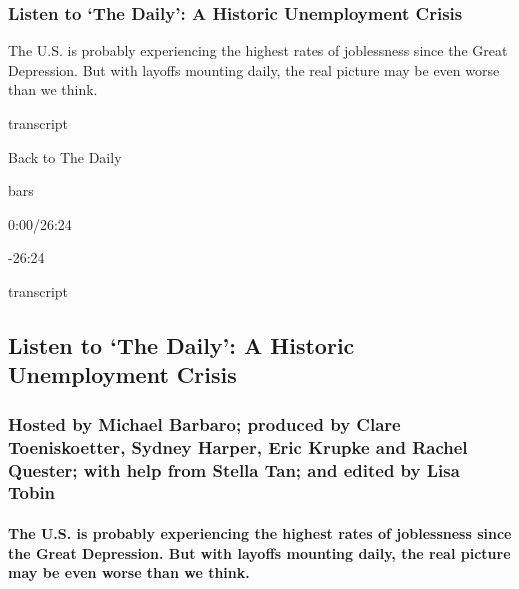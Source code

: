 \hypertarget{listen-to-the-daily-a-historic-unemployment-crisis}{%
\subsubsection{Listen to `The Daily': A Historic Unemployment
Crisis}\label{listen-to-the-daily-a-historic-unemployment-crisis}}

The U.S. is probably experiencing the highest rates of joblessness since
the Great Depression. But with layoffs mounting daily, the real picture
may be even worse than we think.

transcript

Back to The Daily

bars

0:00/26:24

-26:24

transcript

\hypertarget{listen-to-the-daily-a-historic-unemployment-crisis-1}{%
\subsection{Listen to `The Daily': A Historic Unemployment
Crisis}\label{listen-to-the-daily-a-historic-unemployment-crisis-1}}

\hypertarget{hosted-by-michael-barbaro-produced-by-clare-toeniskoetter-sydney-harper-eric-krupke-and-rachel-quester-with-help-from-stella-tan-and-edited-by-lisa-tobin}{%
\subsubsection{Hosted by Michael Barbaro; produced by Clare
Toeniskoetter, Sydney Harper, Eric Krupke and Rachel Quester; with help
from Stella Tan; and edited by Lisa
Tobin}\label{hosted-by-michael-barbaro-produced-by-clare-toeniskoetter-sydney-harper-eric-krupke-and-rachel-quester-with-help-from-stella-tan-and-edited-by-lisa-tobin}}

\hypertarget{the-us-is-probably-experiencing-the-highest-rates-of-joblessness-since-the-great-depression-but-with-layoffs-mounting-daily-the-real-picture-may-be-even-worse-than-we-think}{%
\paragraph{The U.S. is probably experiencing the highest rates of
joblessness since the Great Depression. But with layoffs mounting daily,
the real picture may be even worse than we
think.}\label{the-us-is-probably-experiencing-the-highest-rates-of-joblessness-since-the-great-depression-but-with-layoffs-mounting-daily-the-real-picture-may-be-even-worse-than-we-think}}

